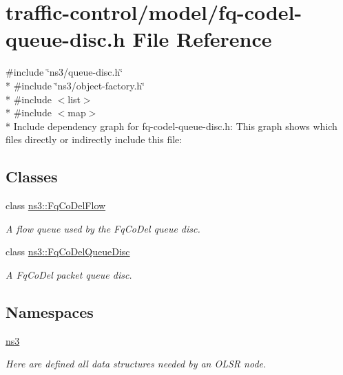 \hypertarget{fq-codel-queue-disc_8h}{}\section{traffic-\/control/model/fq-\/codel-\/queue-\/disc.h File Reference}
\label{fq-codel-queue-disc_8h}
{\ttfamily \#include \char`\"{}ns3/queue-\/disc.\+h\char`\"{}}\\*
{\ttfamily \#include \char`\"{}ns3/object-\/factory.\+h\char`\"{}}\\*
{\ttfamily \#include $<$list$>$}\\*
{\ttfamily \#include $<$map$>$}\\*
Include dependency graph for fq-\/codel-\/queue-\/disc.h\+:
This graph shows which files directly or indirectly include this file\+:
\subsection*{Classes}
\begin{DoxyCompactItemize}
\item 
class \hyperlink{classns3_1_1FqCoDelFlow}{ns3\+::\+Fq\+Co\+Del\+Flow}
\begin{DoxyCompactList}\small\item\em A flow queue used by the Fq\+Co\+Del queue disc. \end{DoxyCompactList}\item 
class \hyperlink{classns3_1_1FqCoDelQueueDisc}{ns3\+::\+Fq\+Co\+Del\+Queue\+Disc}
\begin{DoxyCompactList}\small\item\em A Fq\+Co\+Del packet queue disc. \end{DoxyCompactList}\end{DoxyCompactItemize}
\subsection*{Namespaces}
\begin{DoxyCompactItemize}
\item 
 \hyperlink{namespacens3}{ns3}
\begin{DoxyCompactList}\small\item\em Here are defined all data structures needed by an O\+L\+SR node. \end{DoxyCompactList}\end{DoxyCompactItemize}

